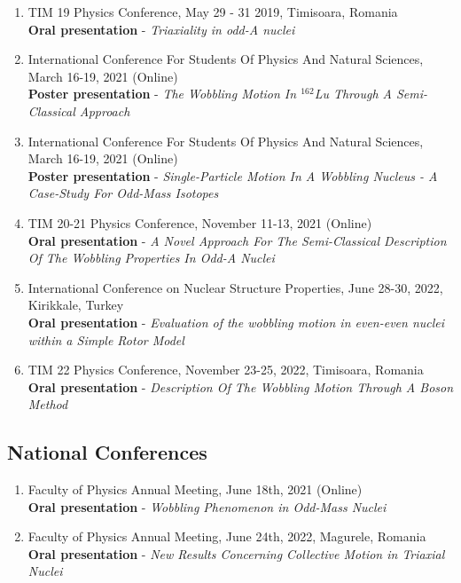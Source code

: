 \begin{enumerate}
    \item TIM 19 Physics Conference, May 29 - 31 2019, Timisoara, Romania\\
    \faMicrophone{} {}\textbf{Oral presentation} - \emph{Triaxiality in odd-A nuclei}
    \item International Conference For Students Of Physics And Natural Sciences, March 16-19, 2021 (Online)\\
    \faDesktop{} {}\textbf{Poster presentation} - \emph{The Wobbling Motion In $^{162}$Lu Through A Semi-Classical Approach} %
    \item International Conference For Students Of Physics And Natural Sciences, March 16-19, 2021 (Online)\\
    \faDesktop{} {}\textbf{Poster presentation} - \emph{Single-Particle Motion In A Wobbling Nucleus - A Case-Study For Odd-Mass Isotopes}
    \item TIM 20-21 Physics Conference, November 11-13, 2021 (Online)\\
    \faMicrophone{} {}\textbf{Oral presentation} - \emph{A Novel Approach For The Semi-Classical Description Of The Wobbling Properties In Odd-A Nuclei}
    \item International Conference on Nuclear Structure Properties, June 28-30, 2022, Kirikkale, Turkey\\
    \faMicrophone{} {}\textbf{Oral presentation} - \emph{Evaluation of the wobbling motion in even-even nuclei within a Simple Rotor Model}
    \item TIM 22 Physics Conference, November 23-25, 2022, Timisoara, Romania\\
    \faMicrophone{} {}\textbf{Oral presentation} - \emph{Description Of The Wobbling Motion Through A Boson Method}
\end{enumerate}

\subsection{National Conferences}
\begin{enumerate}
    \item Faculty of Physics Annual Meeting, June 18th, 2021 (Online)\\
    \faMicrophone{} {}\textbf{Oral presentation} - \emph{Wobbling Phenomenon in Odd-Mass Nuclei}
    \item Faculty of Physics Annual Meeting, June 24th, 2022, Magurele, Romania\\
    \faMicrophone{} {}\textbf{Oral presentation} - \emph{New Results Concerning Collective Motion in Triaxial Nuclei}
\end{enumerate}
